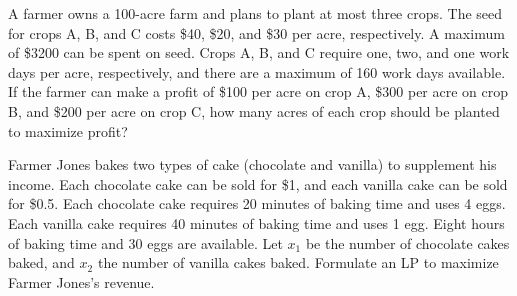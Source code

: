 \begin{Ejer} A farmer owns a 100-acre farm and plans to plant at most three crops. The seed for crops A, B, and C costs \$40, \$20, and \$30 per acre, respectively. A maximum of \$3200 can be spent on seed. Crops A, B, and C require one, two, and one work days per acre, respectively, and there are a maximum of 160 work days available. If the farmer can make a profit of \$100 per acre on crop A, \$300 per acre on crop B, and \$200 per acre on crop C, how many acres of each crop should be planted to maximize profit?

\end{Ejer}

\begin{Ejer} Farmer Jones bakes two types of cake (chocolate and vanilla) to supplement his income. Each chocolate cake can be sold for \$1, and each vanilla cake can be sold for \$0.5. Each chocolate cake requires 20 minutes of baking time and uses 4 eggs. Each vanilla cake requires 40 minutes of baking time and uses 1 egg. Eight hours of baking time and 30 eggs are available. Let $x_1$ be the number of chocolate cakes baked, and $x_2$ the number of vanilla cakes baked. Formulate an LP to maximize Farmer Jones's revenue.

\end{Ejer}


